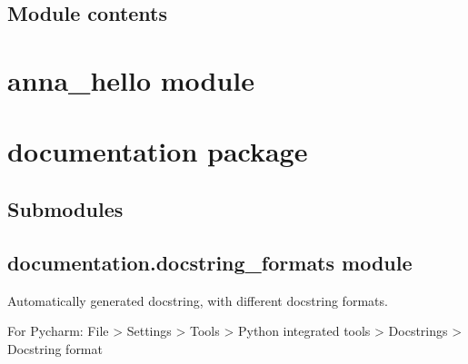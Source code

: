 \documentclass[letterpaper,10pt,english]{sphinxmanual}
\begin{document}
\subsection{Module contents}
\label{\detokenize{anna:module-anna}}\label{\detokenize{anna:module-contents}}

\section{anna\_hello module}
\label{\detokenize{anna_hello:module-anna_hello}}\label{\detokenize{anna_hello:anna-hello-module}}\label{\detokenize{anna_hello::doc}}

\section{documentation package}
\label{\detokenize{documentation:documentation-package}}\label{\detokenize{documentation::doc}}

\subsection{Submodules}
\label{\detokenize{documentation:submodules}}

\subsection{documentation.docstring\_formats module}
\label{\detokenize{documentation:module-documentation.docstring_formats}}\label{\detokenize{documentation:documentation-docstring-formats-module}}
Automatically generated docstring, with different docstring formats.

For Pycharm:
File \sphinxhyphen{}\textgreater{} Settings \sphinxhyphen{}\textgreater{} Tools \sphinxhyphen{}\textgreater{} Python integrated tools \sphinxhyphen{}\textgreater{} Docstrings \sphinxhyphen{}\textgreater{} Docstring format
\end{document}
